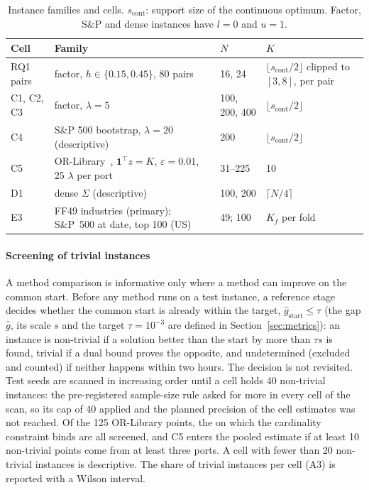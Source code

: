 \begin{table}[t]
\centering\footnotesize\setlength{\tabcolsep}{4pt}
\caption{Instance families and cells. $s_{\mathrm{cont}}$: support size of the continuous optimum. Factor, S\&P and
dense instances have $l = 0$ and $u = 1$.}\label{tab:cells}
\begin{tabular}{p{}p{}p{}p{}} %
\toprule
Cell & Family & $N$ & $K$ \\
\midrule
RQ1 pairs & factor, $h \in \{0.15, 0.45\}$, 80 pairs & 16, 24 & $\lfloor s_{\mathrm{cont}}/2 \rfloor$ clipped to $[3, 8]$, per pair \\ %
C1, C2, C3 & factor, $\lambda = 5$ & 100, 200, 400 & $\lfloor s_{\mathrm{cont}}/2 \rfloor$ \\
C4 & S\&P 500 bootstrap, $\lambda = 20$ (descriptive) & 200 & $\lfloor s_{\mathrm{cont}}/2 \rfloor$ \\
C5 & OR-Library~\cite{chang2000heuristics}, $\mathbf{1}^{\top}z = K$, $\varepsilon = 0.01$, 25 $\lambda$ per port & 31--225 & 10 \\ %
D1 & dense $\Sigma$ (descriptive) & 100, 200 & $\lceil N/4 \rceil$ \\
\midrule
E3 & FF49 industries (primary); S\&P~500 at date, top 100 (US) & 49; 100 & $K_f$ per fold \\
\bottomrule
\end{tabular}
\end{table}

\paragraph{Screening of trivial instances} A method comparison is informative only where a method can improve on
the common start. Before any method runs on a test instance, a reference stage decides whether the common start is
already within the target, $\hat g_{\mathrm{start}} \le \tau$ (the gap $\hat g$, its scale $s$ and the target
$\tau = 10^{-3}$ are defined in Section~\ref{sec:metrics}): an instance is non-trivial if a solution better than the
start by more than $\tau s$ is found, trivial if a dual bound proves the opposite, and undetermined (excluded and
counted) if neither happens within two hours. The decision is not revisited. Test seeds are scanned in increasing order
until a cell holds 40 non-trivial instances: the pre-registered sample-size rule asked for more in every cell of the scan,
so its cap of 40 applied and the planned precision of the cell estimates was not reached. Of the 125 OR-Library points,
the  on which the cardinality constraint binds are all screened, and C5 enters the pooled
estimate if at least 10 non-trivial points come from at least three ports. A cell with fewer than 20 non-trivial instances is descriptive. The share of trivial instances per cell (A3) is
reported with a Wilson interval.

